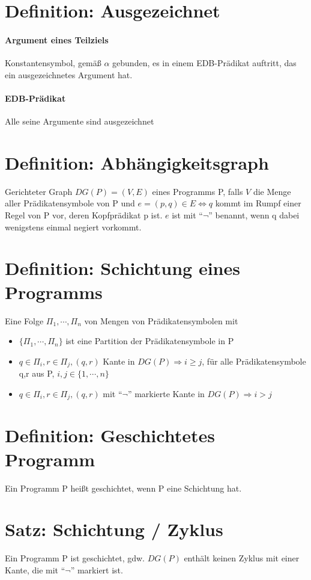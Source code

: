 \documentclass[12pt, a4paper]{article}
\begin{document}
\section*{Definition: Ausgezeichnet}
\paragraph{Argument eines Teilziels}
Konstantensymbol, gemäß $\alpha$ gebunden, es in einem EDB-Prädikat auftritt, das ein ausgezeichnetes Argument hat.

\paragraph{EDB-Prädikat}
Alle seine Argumente sind ausgezeichnet

\section*{Definition: Abhängigkeitsgraph}
Gerichteter Graph $DG(P) = (V,E)$ eines Programms P, falls $V$ die Menge aller Prädikatensymbole von P und $e = (p,q) \in E \Leftrightarrow q$ kommt im Rumpf einer Regel von P vor, deren Kopfprädikat p ist. $e$ ist mit ``$\lnot$'' benannt, wenn q dabei wenigstens einmal negiert vorkommt.

\section*{Definition: Schichtung eines Programms}
Eine Folge $\Pi_1, \cdots, \Pi_n$ von Mengen von Prädikatensymbolen mit
\begin{itemize}
	\item $\{ \Pi_1, \cdots, \Pi_n \}$ ist eine Partition der Prädikatensymbole in P
	\item $q \in \Pi_i, r \in \Pi_j, (q,r)$ Kante in $DG(P) \Rightarrow i \ge j$, für alle Prädikatensymbole q,r aus P, $i,j \in \{1, \cdots, n\}$
	\item $q \in \Pi_i, r \in \Pi_j, (q,r)$ mit ``$\lnot$'' markierte Kante in $DG(P) \Rightarrow i > j$
\end{itemize}

\section*{Definition: Geschichtetes Programm}
Ein Programm P heißt geschichtet, wenn P eine Schichtung hat.

\section*{Satz: Schichtung / Zyklus}
Ein Programm P ist geschichtet, gdw. $DG(P)$ enthält keinen Zyklus mit einer Kante, die mit ``$\lnot$'' markiert ist.
\end{document}
